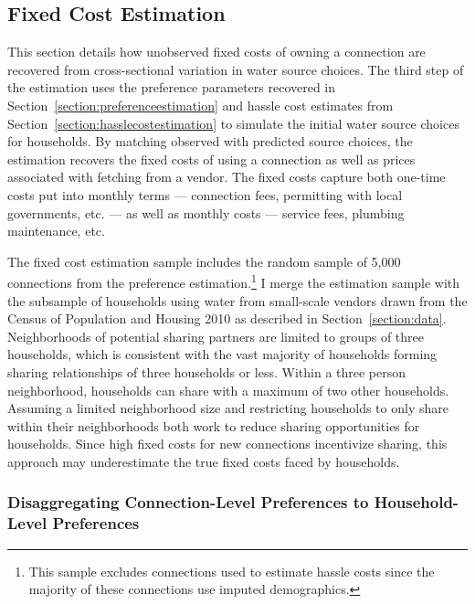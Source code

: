 \documentclass[12pt]{article}
\begin{document}

\subsection{Fixed Cost Estimation}\label{section:fixedcostestimation}

This section details how unobserved fixed costs of owning a connection are recovered from cross-sectional variation in water source choices.  The third step of the estimation uses the preference parameters recovered in Section~\ref{section:preferenceestimation} and hassle cost estimates from Section~\ref{section:hasslecostestimation} to simulate the initial water source choices for households.  By matching observed with predicted source choices, the estimation recovers the fixed costs of using a connection as well as prices associated with fetching from a vendor.  The fixed costs capture both one-time costs put into monthly terms --- connection fees, permitting with local governments, etc. --- as well as monthly costs --- service fees, plumbing maintenance, etc.  

The fixed cost estimation sample includes the random sample of 5,000 connections from the preference estimation.\footnote{This sample excludes connections used to estimate hassle costs since the majority of these connections use imputed demographics.}  I merge the estimation sample with the subsample of households using water from small-scale vendors drawn from the Census of Population and Housing 2010 as described in Section~\ref{section:data}.  Neighborhoods of potential sharing partners are limited to groups of three households, which is consistent with the vast majority of households forming sharing relationships of three households or less.  Within a three person neighborhood, households can share with a maximum of two other households. Assuming a limited neighborhood size and restricting households to only share within their neighborhoods both work to reduce sharing opportunities for households.  Since high fixed costs for new connections incentivize sharing, this approach may underestimate the true fixed costs faced by households.  

\subsubsection{Disaggregating Connection-Level Preferences to Household-Level Preferences}\label{section:disaggregation}
\end{document}
